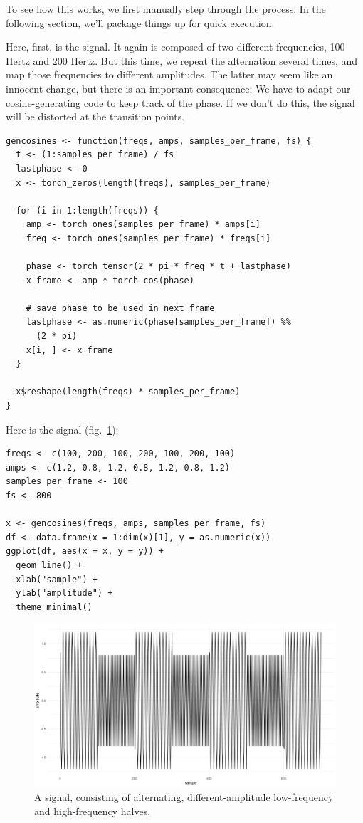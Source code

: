 \documentclass[
  letterpaper,
]{krantz}
\begin{document}
To see how this works, we first manually step through the process. In
the following section, we'll package things up for quick execution.

Here, first, is the signal. It again is composed of two different
frequencies, 100 Hertz and 200 Hertz. But this time, we repeat the
alternation several times, and map those frequencies to different
amplitudes. The latter may seem like an innocent change, but there is an
important consequence: We have to adapt our cosine-generating code to
keep track of the phase. If we don't do this, the signal will be
distorted at the transition points.

\begin{verbatim}
gencosines <- function(freqs, amps, samples_per_frame, fs) {
  t <- (1:samples_per_frame) / fs
  lastphase <- 0
  x <- torch_zeros(length(freqs), samples_per_frame)

  for (i in 1:length(freqs)) {
    amp <- torch_ones(samples_per_frame) * amps[i]
    freq <- torch_ones(samples_per_frame) * freqs[i]

    phase <- torch_tensor(2 * pi * freq * t + lastphase)
    x_frame <- amp * torch_cos(phase)

    # save phase to be used in next frame
    lastphase <- as.numeric(phase[samples_per_frame]) %%
      (2 * pi)
    x[i, ] <- x_frame
  }

  x$reshape(length(freqs) * samples_per_frame)
}
\end{verbatim}

Here is the signal (fig.~\ref{fig-wav-signal-long}):

\begin{verbatim}
freqs <- c(100, 200, 100, 200, 100, 200, 100)
amps <- c(1.2, 0.8, 1.2, 0.8, 1.2, 0.8, 1.2)
samples_per_frame <- 100
fs <- 800

x <- gencosines(freqs, amps, samples_per_frame, fs)
df <- data.frame(x = 1:dim(x)[1], y = as.numeric(x))
ggplot(df, aes(x = x, y = y)) +
  geom_line() +
  xlab("sample") +
  ylab("amplitude") +
  theme_minimal()
\end{verbatim}

\begin{figure}[H]

{\centering \includegraphics{images/wav-signal-long.png}

}

\caption{\label{fig-wav-signal-long}A signal, consisting of alternating,
different-amplitude low-frequency and high-frequency halves.}

\end{figure}
\end{document}
